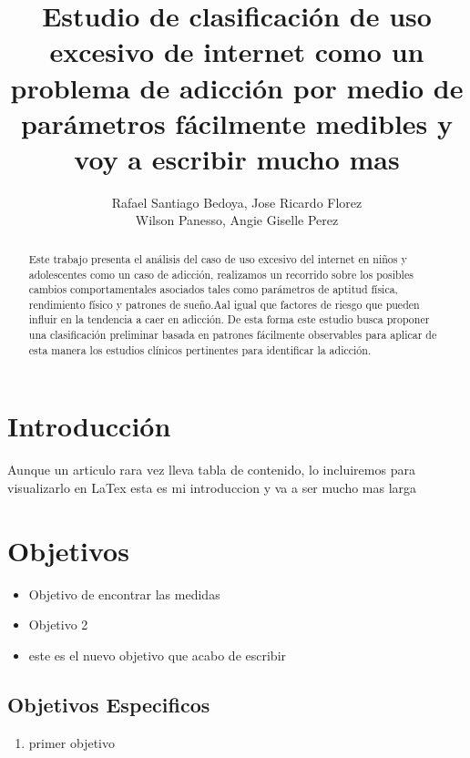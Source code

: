 \documentclass[10pt,letterpaper]{article}
\title{Estudio de clasificación de uso excesivo de internet como un problema de adicción por medio de parámetros fácilmente medibles y voy a escribir mucho mas}
\author{Rafael Santiago Bedoya, Jose Ricardo Florez \\ Wilson Panesso, Angie Giselle Perez}
\date{}                     %
\begin{document}
\maketitle                        %

\begin{abstract}
Este trabajo presenta el análisis del caso de uso excesivo del internet en niños y adolescentes como un caso de adicción, realizamos un recorrido sobre los posibles cambios comportamentales asociados tales como parámetros de aptitud física, rendimiento físico y patrones de sueño.Aal igual que factores de riesgo que pueden influir en la tendencia a caer en adicción. De esta forma este estudio busca proponer una clasificación preliminar basada en patrones \citep{garcia2008riesgos} fácilmente observables para aplicar de esta manera los estudios clínicos pertinentes para identificar la adicción.
\end{abstract}

\newpage
\tableofcontents

\newpage

\section{Introducción}
Aunque un articulo rara vez lleva tabla de contenido, lo incluiremos para visualizarlo en LaTex esta es mi introduccion y va a ser mucho mas larga

\section{Objetivos}

\begin{itemize}
\item Objetivo de encontrar las medidas
\item Objetivo 2
\item este es el nuevo objetivo que acabo de escribir

\end{itemize}

\subsection{Objetivos Especificos}
\begin{enumerate}
\item primer objetivo
    
\end{enumerate}
\end{document}
